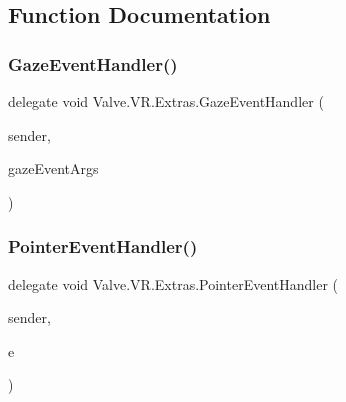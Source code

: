 \subsection{Function Documentation}
\mbox{\label{namespace_valve_1_1_v_r_1_1_extras_a4cb3a72925225d55e7ba6357ef173696}} 
\subsubsection{\texorpdfstring{GazeEventHandler()}{GazeEventHandler()}}
{\footnotesize\ttfamily delegate void Valve.\+V\+R.\+Extras.\+Gaze\+Event\+Handler (\begin{DoxyParamCaption}\item[{object}]{sender,  }\item[{\mbox{\hyperlink{struct_valve_1_1_v_r_1_1_extras_1_1_gaze_event_args}{Gaze\+Event\+Args}}}]{gaze\+Event\+Args }\end{DoxyParamCaption})}

\mbox{\label{namespace_valve_1_1_v_r_1_1_extras_a4f3c764399c18eb442dd4f3c4fcba807}} 
\subsubsection{\texorpdfstring{PointerEventHandler()}{PointerEventHandler()}}
{\footnotesize\ttfamily delegate void Valve.\+V\+R.\+Extras.\+Pointer\+Event\+Handler (\begin{DoxyParamCaption}\item[{object}]{sender,  }\item[{\mbox{\hyperlink{struct_valve_1_1_v_r_1_1_extras_1_1_pointer_event_args}{Pointer\+Event\+Args}}}]{e }\end{DoxyParamCaption})}

